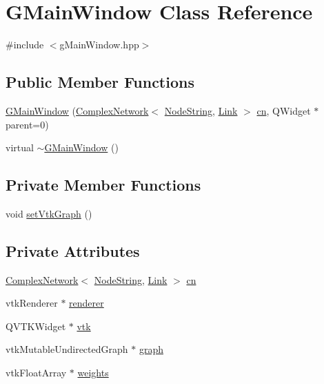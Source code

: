 \hypertarget{class_g_main_window}{\section{G\+Main\+Window Class Reference}
\label{class_g_main_window}
}


{\ttfamily \#include $<$g\+Main\+Window.\+hpp$>$}

\subsection*{Public Member Functions}
\begin{DoxyCompactItemize}
\item 
\hyperlink{class_g_main_window_a81effcaa68ea6dd1ac1a8cbd63df1f06}{G\+Main\+Window} (\hyperlink{class_complex_network}{Complex\+Network}$<$ \hyperlink{class_node_string}{Node\+String}, \hyperlink{class_link}{Link} $>$ \hyperlink{class_g_main_window_a2cf6402d280d2fe91463ee9efa941e75}{cn}, Q\+Widget $\ast$parent=0)
\item 
virtual \hyperlink{class_g_main_window_a828128107557ff68eb709fd416b77cb2}{$\sim$\+G\+Main\+Window} ()
\end{DoxyCompactItemize}
\subsection*{Private Member Functions}
\begin{DoxyCompactItemize}
\item 
void \hyperlink{class_g_main_window_a464bcf8c3f6ec788398c275ff4bd800d}{set\+Vtk\+Graph} ()
\end{DoxyCompactItemize}
\subsection*{Private Attributes}
\begin{DoxyCompactItemize}
\item 
\hyperlink{class_complex_network}{Complex\+Network}$<$ \hyperlink{class_node_string}{Node\+String}, \hyperlink{class_link}{Link} $>$ \hyperlink{class_g_main_window_a2cf6402d280d2fe91463ee9efa941e75}{cn}
\item 
vtk\+Renderer $\ast$ \hyperlink{class_g_main_window_a691d66ce40f6c4782519f50be5e70654}{renderer}
\item 
Q\+V\+T\+K\+Widget $\ast$ \hyperlink{class_g_main_window_a0133dd3a1b89e887ede8aec262844914}{vtk}
\item 
vtk\+Mutable\+Undirected\+Graph $\ast$ \hyperlink{class_g_main_window_ab97c0cde05fda7d301306e82daaeab57}{graph}
\item 
vtk\+Float\+Array $\ast$ \hyperlink{class_g_main_window_a90fc9b6fbd1838ac294c5f00894b1bd7}{weights}
\end{DoxyCompactItemize}


